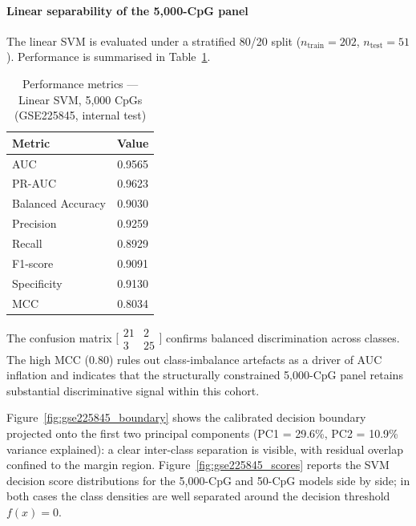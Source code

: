 \paragraph{Linear separability of the 5,000-CpG panel}

The linear SVM is evaluated under a stratified 80/20 split
($n_{\mathrm{train}} = 202$, $n_{\mathrm{test}} = 51$).
Performance is summarised in Table~\ref{tab:gse225845_5k}.

\begin{table}[H]
\centering
\caption{Performance metrics — Linear SVM, 5,000 CpGs
         (GSE225845, internal test)}
\label{tab:gse225845_5k}
\begin{tabular}{lc}
\toprule
Metric & Value \\
\midrule
AUC               & 0.9565 \\
PR-AUC            & 0.9623 \\
Balanced Accuracy & 0.9030 \\
Precision         & 0.9259 \\
Recall            & 0.8929 \\
F1-score          & 0.9091 \\
Specificity       & 0.9130 \\
MCC               & 0.8034 \\
\bottomrule
\end{tabular}
\end{table}

The confusion matrix
$\bigl[\begin{smallmatrix}21&2\\3&25\end{smallmatrix}\bigr]$
confirms balanced discrimination across classes. The high
MCC (0.80) rules out class-imbalance artefacts as a driver
of AUC inflation and indicates that the structurally
constrained 5,000-CpG panel retains substantial discriminative
signal within this cohort.

Figure~\ref{fig:gse225845_boundary} shows the calibrated
decision boundary projected onto the first two principal
components (PC1 = 29.6\%, PC2 = 10.9\% variance explained):
a clear inter-class separation is visible, with residual
overlap confined to the margin region.
Figure~\ref{fig:gse225845_scores} reports the SVM decision
score distributions for the 5,000-CpG and 50-CpG models
side by side; in both cases the class densities are well
separated around the decision threshold $f(x) = 0$.

